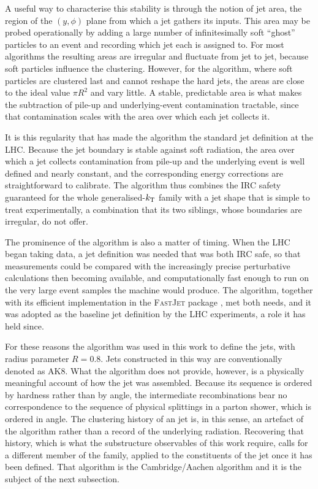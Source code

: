 A useful way to characterise this stability is through the notion of jet area, the
region of the $(y,\phi)$ plane from which a jet gathers its inputs. This area may
be probed operationally by adding a large number of infinitesimally soft
``ghost'' particles to an event and recording which jet each is assigned to. For
most algorithms the resulting areas are irregular and fluctuate from jet to jet,
because soft particles influence the clustering. However, for the \antikt{} algorithm,
where soft particles are clustered last and cannot reshape the hard jets, the
areas are close to the ideal value $\pi R^2$ and vary little. A stable, predictable
area is what makes the subtraction of pile-up and underlying-event contamination
tractable, since that contamination scales with the area over which each jet
collects it.

It is this regularity that has made the \antikt{} algorithm the standard jet
definition at the LHC. Because the jet boundary is stable against soft radiation,
the area over which a jet collects contamination from pile-up and the underlying
event is well defined and nearly constant, and the corresponding energy
corrections are straightforward to calibrate. The algorithm thus combines the IRC
safety guaranteed for the whole generalised-$k_{\mathrm{T}}$ family with a jet shape that
is simple to treat experimentally, a combination that
its two siblings, whose boundaries are irregular, do not offer.

The prominence of the algorithm is also a matter of timing. When the LHC began
taking data, a jet definition was needed that was both IRC safe, so that
measurements could be compared with the increasingly precise perturbative
calculations then becoming available, and computationally fast enough to run on
the very large event samples the machine would produce. The \antikt{} algorithm,
together with its efficient implementation in the \textsc{FastJet}
package \cite{Cacciari_2012}, met both needs, and it was adopted as the baseline jet
definition by the LHC experiments, a role it has held since.

For these reasons the \antikt{} algorithm was used in this work to define
the jets, with radius parameter $R = 0.8$. Jets constructed in this way are
conventionally denoted as AK8. What the algorithm does not provide, however, is a
physically meaningful account of how the jet was assembled. Because its sequence is
ordered by hardness rather than by angle, the intermediate recombinations bear no
correspondence to the sequence of physical splittings in a parton shower, which is
ordered in angle. The clustering history of an \antikt{} jet is, in this sense, an
artefact of the algorithm rather than a record of the underlying radiation.
Recovering that history, which is what the substructure observables of this work
require, calls for a different member of the family, applied to the constituents
of the jet once it has been defined. That algorithm is the Cambridge/Aachen algorithm
and it is the subject of the next subsection.

